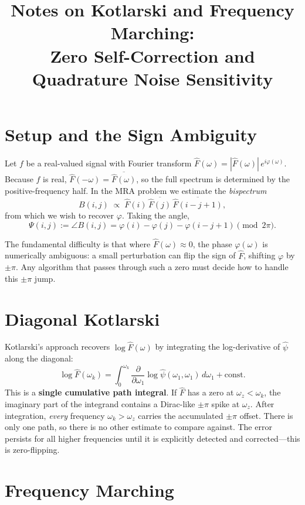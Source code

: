 \documentclass[11pt]{article}
\title{Notes on Kotlarski and Frequency Marching:\\
       Zero Self-Correction and Quadrature Noise Sensitivity}
\date{}
\newcommand{\Fhat}{\hat{F}}
\newcommand{\psihat}{\hat{\psi}}
\begin{document}
\maketitle

\section{Setup and the Sign Ambiguity}

Let $f$ be a real-valued signal with Fourier transform $\Fhat(\omega) =
|\Fhat(\omega)|\,e^{i\varphi(\omega)}$.  Because $f$ is real,
$\Fhat(-\omega) = \overline{\Fhat(\omega)}$, so the full spectrum is
determined by the positive-frequency half.  In the MRA problem we
estimate the \emph{bispectrum}
\[
    B(i,j) \;\propto\; \Fhat(i)\,\overline{\Fhat(j)}\,\overline{\Fhat(i-j+1)},
\]
from which we wish to recover $\varphi$.  Taking the angle,
\[
    \Psi(i,j) := \angle B(i,j) = \varphi(i) - \varphi(j) - \varphi(i-j+1)
    \pmod{2\pi}.
\]

The fundamental difficulty is that where $\Fhat(\omega) \approx 0$,
the phase $\varphi(\omega)$ is numerically ambiguous: a small perturbation
can flip the sign of $\Fhat$, shifting $\varphi$ by $\pm\pi$.  Any
algorithm that passes through such a zero must decide how to handle
this $\pm\pi$ jump.

\section{Diagonal Kotlarski}

Kotlarski's approach recovers $\log\Fhat(\omega)$ by integrating the
log-derivative of $\psihat$ along the diagonal:
\[
    \log\Fhat(\omega_k) = \int_0^{\omega_k}
    \frac{\partial}{\partial\omega_1}\log\psihat(\omega_1,\omega_1)\,d\omega_1
    + \text{const}.
\]
This is a \textbf{single cumulative path integral}.  If $\Fhat$ has a
zero at $\omega_z < \omega_k$, the imaginary part of the integrand
contains a Dirac-like $\pm\pi$ spike at $\omega_z$.  After integration,
\emph{every} frequency $\omega_k > \omega_z$ carries the accumulated
$\pm\pi$ offset.  There is only one path, so there is no other estimate
to compare against.  The error persists for all higher frequencies until
it is explicitly detected and corrected---this is zero-flipping.

\section{Frequency Marching}
\end{document}
